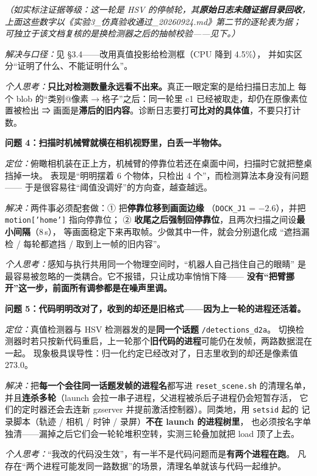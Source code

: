 \documentclass[12pt,a4paper]{ctexart}
\begin{document}
\textit{（如实标注证据等级：这一轮是 HSV 的停帧轮，其\textbf{原始日志未随证据目录回收}，
上面这些数字以《实验3\_仿真验收通过\_20260924.md》第二节的逐轮表为据；
可独立于该文档复核的是换检测器之后的抽帧校验——见下。）}

\textit{解决与口径：}见 §3.4——改用真值投影给检测框（CPU 降到 4.5\%），
并如实区分“证明了什么、不能证明什么”。

\textit{个人思考：}\textbf{只比对检测数量永远看不出来。}真正一眼定案的是给扫描日志加上
每个 blob 的“类别@像素$\to$格子”之后：同一轮里 c1 已经被取走，却仍在原像素位置被检出
⇒ 画面是\textbf{滞后的旧内容}。诊断日志要打\textbf{可比对的具体值}，不要只打计数。

\medskip
\textbf{问题 4：扫描时机械臂就横在相机视野里，白丢一半物体。}

\textit{定位：}俯瞰相机装在正上方，机械臂的停靠位若还在桌面中间，扫描时它就把整桌挡掉一块。
表现是“明明摆着 6 个物体，只检出 4 个”，而检测算法本身没有问题——
于是很容易往“阈值没调好”的方向查，越查越远。

\textit{解决：}两件事必须配套做：① 把\textbf{停靠位移到画面边缘}
（\texttt{DOCK\_J1} = $-2.6$），并把 \texttt{motion['home']} 指向停靠位；
② \textbf{收尾之后强制回停靠位}，且两次扫描之间设\textbf{最小间隔}（8\,s），
等画面稳定下来再取帧。少做其中一件，就会分别退化成
“遮挡漏检 / 每轮都遮挡 / 取到上一帧的旧内容”。

\textit{个人思考：}感知与执行共用同一个物理空间时，“机器人自己挡住自己的眼睛”
是最容易被忽略的一类耦合。它不报错，只让成功率悄悄下降——
\textbf{没有“把臂挪开”这一步，前面所有调参都是在噪声里调。}

\medskip
\textbf{问题 5：代码明明改对了，收到的却还是旧格式——因为上一轮的进程还活着。}

\textit{定位：}真值检测器与 HSV 检测器发的是\textbf{同一个话题} \texttt{/detections\_d2a}。
切换检测器时若只按新代码重启，上一轮那个\textbf{旧代码的进程}可能仍在发帧，两路数据混在一起。
现象极具误导性：归一化约定已经改对了，日志里收到的却还是像素值 273.0。

\textit{解决：}把\textbf{每一个会往同一话题发帧的进程名}都写进 \texttt{reset\_scene.sh}
的清理名单，并且\textbf{连杀多轮}（launch 会拉一串子进程，父进程被杀后子进程仍会短暂存活，
它们的定时器还会去连新 gzserver 并提前激活控制器）。同类地，用 \texttt{setsid} 起的
记录脚本（轨迹 / 相机 / 时钟 / 录屏）\textbf{不在 launch 的进程树里}，
也必须按名字单独清——漏掉之后它们会一轮轮堆积空转，实测三轮叠加就把 load 顶了上去。

\textit{个人思考：}“我改的代码没生效”，有一半不是代码问题而是\textbf{有两个进程在跑}。
凡存在“两个进程可能发同一路数据”的场景，清理名单就该与代码一起维护。
\end{document}
